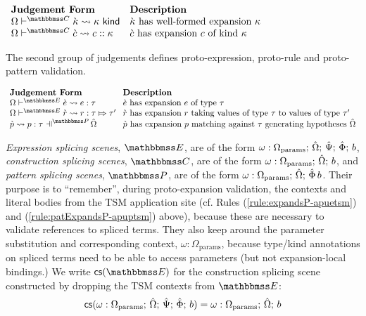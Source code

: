 \vspace{10px}\noindent
$\begin{array}{ll}
\textbf{Judgement Form} & \textbf{Description}\\
\cvalidKX{\cekappa}{\kappa} & \text{$\cekappa$ has well-formed expansion $\kappa$}\\
\cvalidCX{\cec}{c}{\kappa} & \text{$\cec$ has expansion $c$ of kind $\kappa$}\\
\end{array}$
\vspace{10px}

The second group of judgements defines proto-expression, proto-rule and proto-pattern validation.

\vspace{10px}\noindent
$\arraycolsep=4pt\begin{array}{ll}
\textbf{Judgement Form} & \textbf{Description}\\
\cvalidEPX{\ce}{e}{\tau} & \text{$\ce$ has expansion $e$ of type $\tau$}\\
\cvalidRP{\Omega}{\escenev}{\crv}{r}{\tau}{\tau'} & \text{$\crv$ has expansion $r$ taking values of type $\tau$ to values of type $\tau'$}\\
\cvalidPPE{\uOmega}{\pscenev}{\cpv}{p}{\tau} & \text{$\cpv$ has expansion $p$ matching against $\tau$ generating hypotheses $\uOmega$}
\end{array}$
\vspace{10px}

\emph{Expression splicing scenes}, $\escenev$, are of the form $\omega : \Omega_\text{params};\,{\hat\Omega};\,\hat{\Psi};\,\hat\Phi;\,b$, \emph{construction splicing scenes}, $\cscenev$, are of the form $\omega : \Omega_\text{params};\,{\hat\Omega};\,b$, and \emph{pattern splicing scenes}, $\pscenev$, are of the form $\omega : \Omega_\text{params};\,{\hat\Omega};\,\hat\Phi\,b$. Their purpose is to ``remember'', during proto-expansion validation, the contexts and literal bodies from the TSM application site (cf. Rules (\ref{rule:expandsP-apuetsm}) and (\ref{rule:patExpandsP-apuptsm}) above), because these are necessary to validate references to spliced terms. They also keep around the parameter substitution and corresponding context, $\omega : \Omega_\text{params}$, because type/kind annotations on spliced terms need to be able to access parameters (but not expansion-local bindings.) 
We write $\csfrom{\escenev}$ for the construction splicing scene constructed by dropping the TSM contexts from $\escenev$:
\[\mathsf{cs}(\omega : \Omega_\text{params};\,{\hat\Omega};\,\hat{\Psi};\,\hat\Phi;\,b) = \omega : \Omega_\text{params};\,{\hat\Omega};\,b\]

